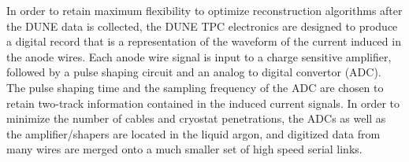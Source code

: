 In order to retain maximum flexibility to optimize reconstruction algorithms after the DUNE data is collected, the DUNE TPC electronics are designed to produce a digital record that is a representation of the waveform of the current induced in the anode wires.  Each anode wire signal is input to a charge sensitive amplifier, followed by a pulse shaping circuit and an analog to digital convertor (ADC).  The pulse shaping time and the sampling frequency of the ADC are chosen to retain two-track information contained in the induced current signals.  In order to minimize the number of cables and cryostat penetrations, the ADCs as well as the amplifier/shapers are located in the liquid argon, and digitized data from many wires are merged onto a much smaller set of high speed serial links.  %


